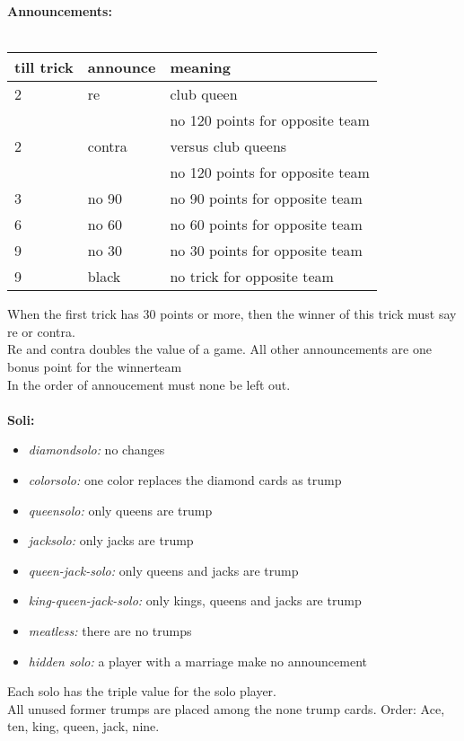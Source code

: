 \documentclass[a4paper,11pt,twocolumn]{article}
\begin{document}
\newpage
\textbf{Announcements:}\ \\
\smallskip\ \\
\begin{tabular}{lll}
till trick & announce & meaning\\\hline
2 & re  & club queen \\
  &     & no 120 points for opposite team\\
2 & contra & versus club queens \\
  &        & no 120 points for opposite team\\
3 & no 90 & no 90 points for opposite team\\
6 & no 60 & no 60 points for opposite team\\
9 & no 30 & no 30 points for opposite team\\
9 & black & no trick for opposite team\\
\end{tabular}
\medskip

When the first trick has 30 points or more, then the winner of this trick must say re or contra.
\\
Re and contra doubles the value of a game. All other announcements are one bonus point for the winnerteam
\\
In the order of annoucement must none be left out.
\ \\
\smallskip
\ \\
\textbf{Soli:}
\begin{itemize}
\item \textit{diamondsolo:} no changes
\item \textit{colorsolo:} one color replaces the diamond cards as trump
\item \textit{queensolo:} only queens are trump
\item \textit{jacksolo:} only jacks are trump
\item \textit{queen-jack-solo:} only queens and jacks are trump
\item \textit{king-queen-jack-solo:} only kings, queens and jacks are trump
\item \textit{meatless:} there are no trumps
\item \textit{hidden solo:} a player with a marriage make no announcement
\end{itemize}
Each solo has the triple value for the solo player.\\
All unused former trumps are placed among the none trump cards. Order:
Ace, ten, king, queen, jack, nine.
\end{document}
